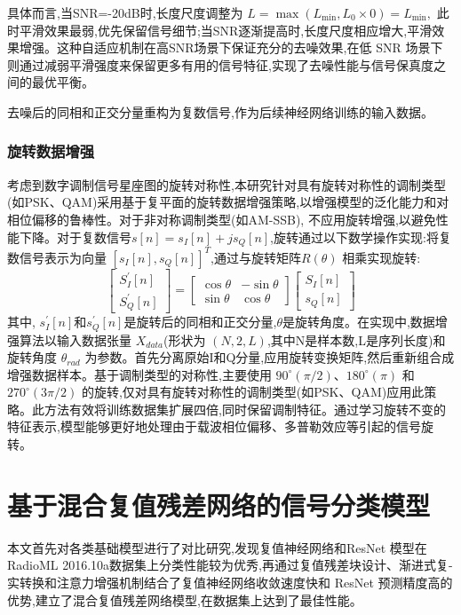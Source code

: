 \documentclass{article}
\begin{document}
\begin{CJK}{UTF8}{gbsn}
具体而言,当SNR=-20dB时,长度尺度调整为 $L=\max(L_{\min},L_{0}\times0)=L_{\min},$ 此时平滑效果最弱,优先保留信号细节;当SNR逐渐提高时,长度尺度相应增大,平滑效果增强。这种自适应机制在高SNR场景下保证充分的去噪效果,在低 SNR 场景下则通过减弱平滑强度来保留更多有用的信号特征,实现了去噪性能与信号保真度之间的最优平衡。

去噪后的同相和正交分量重构为复数信号,作为后续神经网络训练的输入数据。

\subsubsection{旋转数据增强}
考虑到数字调制信号星座图的旋转对称性,本研究针对具有旋转对称性的调制类型(如PSK、QAM)采用基于复平面的旋转数据增强策略,以增强模型的泛化能力和对相位偏移的鲁棒性。对于非对称调制类型(如AM-SSB), 不应用旋转增强,以避免性能下降。对于复数信号$s[n]=s_{I}[n]+js_{Q}[n]$,旋转通过以下数学操作实现:将复数信号表示为向量 $[s_{I}[n],s_{Q}[n]]^{T}$,通过与旋转矩阵$R(\theta)$ 相乘实现旋转:
\begin{equation}
    \begin{bmatrix}
        S_{I}^{\prime}[n]\\
        S_{Q}^{\prime}[n]
    \end{bmatrix}
    =
    \begin{bmatrix}
        \cos\theta & -\sin\theta\\
        \sin\theta & \cos\theta
    \end{bmatrix}
    \begin{bmatrix}
        S_{I}[n]\\
        s_{Q}[n]
    \end{bmatrix}
    \label{eq:rotation_matrix}
\end{equation}
其中, $s_{I}^{\prime}[n]$和$s_{Q}^{\prime}[n]$是旋转后的同相和正交分量,$\theta$是旋转角度。在实现中,数据增强算法以输入数据张量 $X_{data}$(形状为 $(N,2,L)$,其中N是样本数,L是序列长度)和旋转角度 $\theta_{rad}$ 为参数。首先分离原始I和Q分量,应用旋转变换矩阵,然后重新组合成增强数据样本。基于调制类型的对称性,主要使用 $90^{\circ}(\pi/2)$、$180^{\circ}(\pi)$ 和 $270^{\circ}(3\pi/2)$ 的旋转,仅对具有旋转对称性的调制类型(如PSK、QAM)应用此策略。此方法有效将训练数据集扩展四倍,同时保留调制特征。通过学习旋转不变的特征表示,模型能够更好地处理由于载波相位偏移、多普勒效应等引起的信号旋转。

\newpage
\section{基于混合复值残差网络的信号分类模型}
本文首先对各类基础模型进行了对比研究,发现复值神经网络和ResNet 模型在RadioML 2016.10a数据集上分类性能较为优秀,再通过复值残差块设计、渐进式复-实转换和注意力增强机制结合了复值神经网络收敛速度快和 ResNet 预测精度高的优势,建立了混合复值残差网络模型,在数据集上达到了最佳性能。


\end{CJK}
\end{document}
